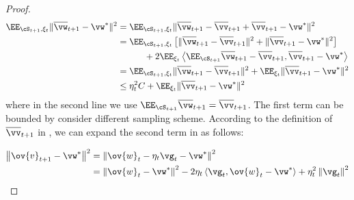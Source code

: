 \begin{proof}
	

\begin{align}
\EE_{\cS_{t+1}, \xi_{t}} \|\overline{\vw}_{t+1} - \vw^*\|^2 &= \EE_{\cS_{t+1}, \xi_{t}} \|\overline{\vw}_{t+1} - \overline{\vv}_{t+1} + \overline{\vv}_{t+1} - \vw^*\|^2\\
&= \EE_{\cS_{t+1}, \xi_{t}} \left[\|\overline{\vw}_{t+1} - \overline{\vv}_{t+1}\|^2 + \|\overline{\vv}_{t+1} - \vw^*\|^2\right] \\
& \hspace{3em}+ 2\EE_{\xi_{t}} \left<\EE_{\cS_{t+1}} \overline{\vw}_{t+1} - \overline{\vv}_{t+1},   \overline{\vv}_{t+1} - \vw^*\right> \\
& = \EE_{\cS_{t+1}, \xi_{t}} \|\overline{\vw}_{t+1} - \overline{\vv}_{t+1}\|^2 + \EE_{\xi_t} \|\overline{\vv}_{t+1} - \vw^*\|^2 \\
& \leq  \eta_t^2 C + \EE_{\xi_t} \|\overline{\vv}_{t+1} - \vw^*\|^2 \label{eq:sgdcvxsmth1}
\end{align}
where in the second line we use $\EE_{\cS_{t+1}} \overline{\vw}_{t+1}  = \overline{\vv}_{t+1}$. 
The first term can be bounded by consider different sampling scheme. 
According to the definition of $\overline{\vv}_{t+1}$ in \eq{\ref{eq:vbar}}, we can expand the second term in \eq{\ref{eq:sgdcvxsmth1}} as follows:

\begin{align*}
\left\|\ov{v}_{t+1}-\vw^{*}\right\|^2 
 &=\left\|\ov{w}_{t}-\eta_{t} \vg_{t}-\vw^{*}\right\|^2 \\
 &=\left\|\ov{w}_{t}-\vw^{*}\right\|^{2}-2 \eta_{t} \left< \vg_{t}, \ov{w}_{t}-\vw^{*} \right>+\eta_{t}^{2}\left\|\vg_{t}\right\|^{2} 
\end{align*}


\end{proof}

